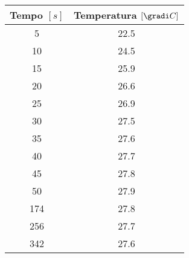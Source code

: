 \begin{tabular}{cc}
\toprule
\multicolumn{1}{c}{Tempo $[s]$} & \multicolumn{1}{c}{Temperatura $[\gradi C]$} \\ \hline
5 & 22.5 \\ \hline
10 & 24.5 \\ \hline
15 & 25.9 \\ \hline
20 & 26.6 \\ \hline
25 & 26.9 \\ \hline
30 & 27.5 \\ \hline
35 & 27.6 \\ \hline
40 & 27.7 \\ \hline
45 & 27.8 \\ \hline
50 & 27.9 \\ \hline
174 & 27.8 \\ \hline
256 & 27.7 \\ \hline
342 & 27.6 \\ 
\bottomrule
\end{tabular}
